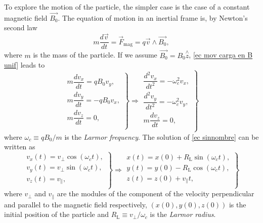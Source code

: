 \documentclass[a4paper,12pt,oneside]{book}
\begin{document}
To explore the motion of the particle, the simpler case is the case of a constant magnetic field $\vec{B_0}$. The equation of motion in an inertial frame is, by Newton's second law
%
\begin{equation} \label{ec mov carga en B unif}
m \dfrac{d \vec{v}}{dt}=\vec{F}_{\text{mag}}=q \vec{v} \wedge \vec{B_0},
\end{equation}
%
where $m$ is the mass of the particle. If we assume $\vec{B_0}=B_0 \stackrel{\wedge}{z}$, \eqref{ec mov carga en B unif} leads to
%
\begin{equation}\label{ec sinnombre}
\left.
\begin{array}{c}
m \dfrac{d v_x}{dt}=q B_0 v_y, \\
m \dfrac{d v_y}{dt}=-q B_0 v_x, \\
m \dfrac{d v_z}{dt}=0, \\
\end{array}
\right\} 
\Rightarrow
\left.
\begin{array}{c}
\dfrac{d^2 v_x}{dt^2}=-\omega_c^2 v_x, \\
\dfrac{d^2 v_y}{dt^2}=-\omega_c^2 v_y, \\
m \dfrac{d v_z}{dt}=0, \\
\end{array}
\right\} 
\end{equation}
%
where $\omega_c \equiv qB_0/m$ is the \textit{Larmor frequency}. The solution of \eqref{ec sinnombre} can be written as
%
\begin{equation}
\left.
\begin{array}{c}
v_x(t)=v_{\perp} \cos(\omega_ct), \\
v_y(t)=v_{\perp} \sin(\omega_ct), \\
v_z(t)=v_{\parallel}, \\
\end{array}
\right\}
\Rightarrow
\left.
\begin{array}{c}
x(t)=x(0)+ R_\text{L} \sin(\omega_c t),\\
y(t)=y(0)- R_\text{L} \cos(\omega_c t),\\
z(t)=z(0)+v_{\parallel}t, \\
\end{array}
\right\}
\end{equation}
%
where $v_{\perp}$ and $v_{\parallel}$ are the modules of the component of the velocity perpendicular and parallel to the magnetic field respectively, $(x(0),y(0),z(0))$ is the initial position of the particle and $R_\text{L} \equiv v_{\perp}/\omega_c$ is the \textit{Larmor radius}. 
\end{document}
